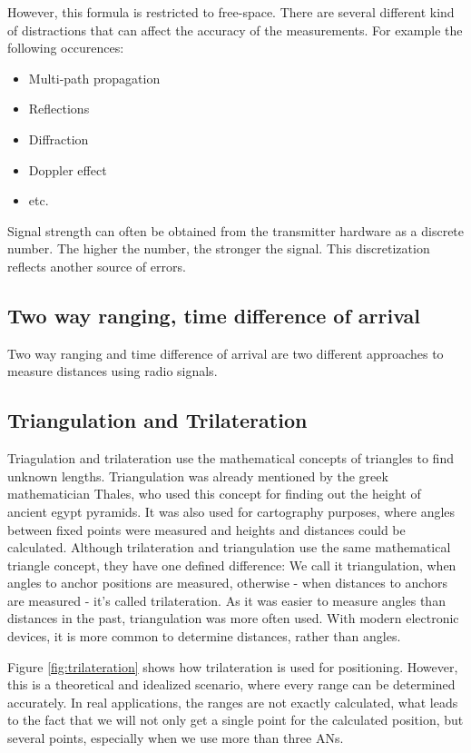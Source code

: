 However, this formula is restricted to free-space. There are several different kind of distractions that can affect the accuracy of the measurements. For example the following occurences:
\begin{itemize} 
\item Multi-path propagation
\item Reflections
\item Diffraction
\item Doppler effect
\item etc.
\end{itemize}

Signal strength can often be obtained from the transmitter hardware as a discrete number. The higher the number, the stronger the signal. This discretization reflects another source of errors. 

\subsection{Two way ranging, time difference of arrival}
Two way ranging and time difference of arrival are two different approaches to measure distances using radio signals.


\subsection{Triangulation and Trilateration}
Triagulation and trilateration use the mathematical concepts of triangles to find unknown lengths. Triangulation was already mentioned by the greek mathematician Thales, who used this concept for finding out the height of ancient egypt pyramids. \cite{thales} It was also used for cartography purposes, where angles between fixed points were measured and heights and distances could be calculated. 
Although trilateration and triangulation use the same mathematical triangle concept, they have one defined difference: We call it triangulation, when angles to anchor positions are measured, otherwise - when distances to anchors are measured - it's called trilateration.
As it was easier to measure angles than distances in the past, triangulation was more often used. With modern electronic devices, it is more common to determine distances, rather than angles. 

Figure \ref{fig:trilateration} shows how trilateration is used for positioning. However, this is a theoretical and idealized scenario, where every range can be determined accurately. In real applications, the ranges are not exactly calculated, what leads to the fact that we will not only get a single point for the calculated position, but several points, especially when we use more than three ANs.

